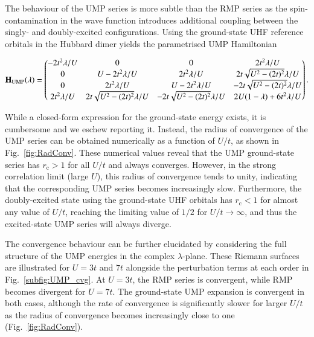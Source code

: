 \documentclass[aps,prb,reprint,noshowkeys,superscriptaddress]{revtex4-1}
\newcommand{\bH}{\mathbf{H}}
\newcommand{\rc}{r_{\text{c}}}
\begin{document}
The behaviour of the UMP series is more subtle than the RMP series as the spin-contamination in the wave function
introduces additional coupling between the singly- and doubly-excited configurations.
Using the ground-state UHF reference orbitals in the Hubbard dimer yields the parametrised UMP Hamiltonian
\begin{widetext}
\begin{equation}
\label{eq:H_UMP}
\bH_\text{UMP}\qty(\lambda) = 
	\begin{pmatrix}
		-2t^2 \lambda/U	&	0									&	0									&	2t^2 \lambda/U		\\
		0				&	U - 2t^2 \lambda/U 					&	2t^2\lambda/U						&	2t \sqrt{U^2 - (2t)^2} \lambda/U	\\
		0				&	2t^2\lambda/U						&	U - 2t^2 \lambda/U 					&	-2t \sqrt{U^2 - (2t)^2} \lambda/U	\\
		2t^2 \lambda/U	&	2t \sqrt{U^2 - (2t)^2} \lambda/U 	&	-2t \sqrt{U^2 - (2t)^2} \lambda/U	&	2U(1-\lambda) + 6t^2\lambda/U		\\
	\end{pmatrix}.
\end{equation}
\end{widetext}
While a closed-form expression for the ground-state energy exists, it is cumbersome and we eschew reporting it.
Instead, the radius of convergence of the UMP series can be obtained numerically as a function of $U/t$, as shown
in Fig.~\ref{fig:RadConv}.
These numerical values reveal that the UMP ground-state series has $\rc > 1$ for all $U/t$ and always converges.
However, in the strong correlation limit (large $U$), this radius of convergence tends to unity, indicating that
the corresponding UMP series becomes increasingly slow.
Furthermore, the doubly-excited state using the ground-state UHF orbitals has $\rc < 1$ for almost any value 
of $U/t$, reaching the limiting value of $1/2$ for $U/t \to \infty$, and thus the 
excited-state UMP series will always diverge.
 
The convergence behaviour can be further elucidated by considering the full structure of the UMP energies 
in the complex $\lambda$-plane.
These Riemann surfaces are illustrated for $U = 3t$ and $7t$ alongside the perturbation terms at each order
in Fig.~\ref{subfig:UMP_cvg}.
At $U = 3t$, the RMP series is convergent, while RMP becomes divergent for $U=7t$.
The ground-state UMP expansion is convergent in both cases, although the rate of convergence is significantly slower 
for larger $U/t$ as the radius of convergence becomes increasingly close to one (Fig.~\ref{fig:RadConv}).
\end{document}
